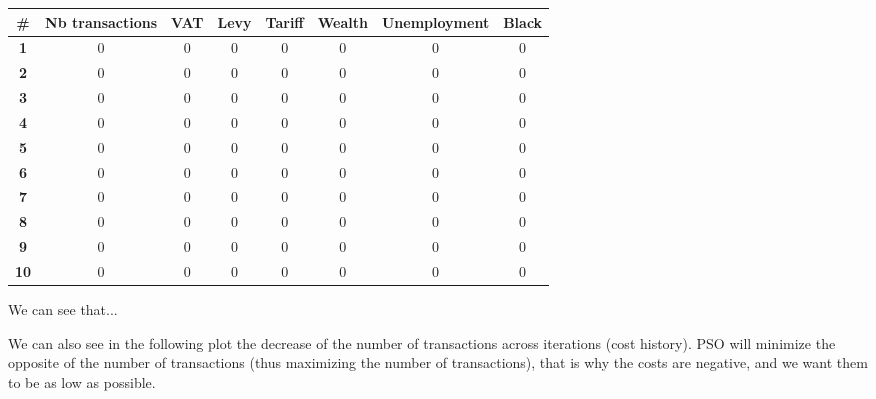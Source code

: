         \begin{table}[H]
        \centering
        \begin{tabular}{|c|c|c|c|c|c|c|c|}
            \hline
            \textbf{\#} & \textbf{Nb transactions}  & \textbf{VAT} & \textbf{Levy} & \textbf{Tariff} & \textbf{Wealth} & \textbf{Unemployment} & \textbf{Black} \\ \hline
            \textbf{1} & 0 & 0 & 0 & 0 & 0 & 0 & 0 \\ \hline
            \textbf{2} & 0 & 0 & 0 & 0 & 0 & 0 & 0 \\ \hline
            \textbf{3} & 0 & 0 & 0 & 0 & 0 & 0 & 0 \\ \hline
            \textbf{4} & 0 & 0 & 0 & 0 & 0 & 0 & 0 \\ \hline
            \textbf{5} & 0 & 0 & 0 & 0 & 0 & 0 & 0 \\ \hline
            \textbf{6} & 0 & 0 & 0 & 0 & 0 & 0 & 0 \\ \hline
            \textbf{7} & 0 & 0 & 0 & 0 & 0 & 0 & 0 \\ \hline
            \textbf{8} & 0 & 0 & 0 & 0 & 0 & 0 & 0 \\ \hline
            \textbf{9} & 0 & 0 & 0 & 0 & 0 & 0 & 0 \\ \hline
            \textbf{10} & 0 & 0 & 0 & 0 & 0 & 0 & 0 \\ \hline
        \end{tabular}
        \end{table}

        We can see that... %

        We can also see in the following plot the decrease of the number of transactions across iterations (cost history). PSO will minimize the opposite of the number of transactions (thus maximizing the number of transactions), that is why the costs are negative, and we want them to be as low as possible.



